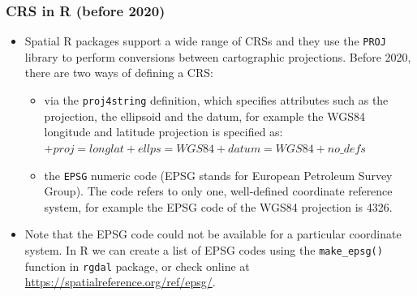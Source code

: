 \documentclass[11pt]{beamer}
\begin{document}
\begin{frame} %
\frametitle{CRS in R (before 2020)}
\begin{itemize} \setlength\itemsep{\fill}
\item Spatial R packages support a wide range of CRSs and they use the \texttt{PROJ} library to perform conversions between cartographic projections. Before 2020, there are two ways of defining a CRS:
\vspace{3pt}
\begin{itemize} \setlength\itemsep{\fill}
\item via the  \texttt{\alert{proj4string}} definition, which specifies attributes such as the projection, the ellipsoid and the datum, for example the WGS84 longitude and latitude projection is specified as:
     {\scriptsize \color{green}$+proj=longlat +ellps=WGS84 +datum=WGS84 +no\_defs$}
     \vspace{3pt}
\item the \texttt{\alert{EPSG}} numeric code (EPSG stands for European Petroleum Survey Group). The code refers to only one, well-defined coordinate reference system, for example the EPSG code of the WGS84 projection is 4326.
\end{itemize}
\item Note that the EPSG code could not be available for a particular coordinate system. In R we can create a list of EPSG codes using the \texttt{make\_epsg()} function in \texttt{rgdal} package, or check online at \url{https://spatialreference.org/ref/epsg/}.
\end{itemize}
\end{frame}
\end{document}
